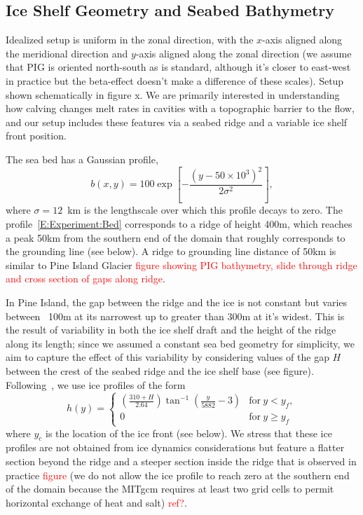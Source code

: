 \documentclass[draft]{agujournal2019}
\newcommand{\red}[1]{\textcolor{red}{#1}}
\begin{document}
\subsection{Ice Shelf Geometry and Seabed Bathymetry}\label{S:Experiment:Geometry}
Idealized setup is uniform in the zonal direction, with the $x$-axis aligned along the meridional direction and $y$-axis aligned along the zonal direction (we assume that PIG is oriented north-south as is standard, although it's closer to east-west in practice but the beta-effect doesn't make a difference of these scales). Setup shown schematically in figure x. We are primarily interested in understanding how calving changes melt rates in cavities with a topographic barrier to the flow, and our setup includes these features via a seabed ridge and a variable ice shelf front position. 

The sea bed has a Gaussian profile,
\begin{equation}\label{E:Experiment:Bed}
    b(x,y) = 100 \exp\left[-\frac{\left(y - 50\times 10^3\right)^2}{2\sigma^2}\right],
\end{equation}
where $\sigma = 12$~km is the lengthscale over which this profile decays to zero. The profile~\ref{E:Experiment:Bed} corresponds to a ridge of height 400m, which reaches a peak 50km from the southern end of the domain that roughly corresponds to the grounding line (see below). A ridge to grounding line distance of 50km is similar to Pine Island Glacier \red{figure showing PIG bathymetry, slide through ridge and cross section of gaps along ridge}.

In Pine Island, the gap between the ridge and the ice is not constant but varies between ~100m at its narrowest up to greater than 300m at it's widest. This is the result of variability in both the ice shelf draft and the height of the ridge along its length; since we assumed a constant sea bed geometry for simplicity, we aim to capture the effect of this variability by considering values of the gap $H$ between the crest of the seabed ridge and the ice shelf base (see figure). Following~, we use ice profiles of the form
\begin{equation}
    h(y) = \begin{cases}
    \left(\frac{310 + H}{2.64}\right)\tan^{-1}\left(\frac{y}{5882} -3\right) & \text{for}~y < y_f,\\
    0  & \text{for}~y \geq y_f
    \end{cases}
\end{equation}
where $y_c$ is the location of the ice front (see below). We stress that these ice profiles are not obtained from ice dynamics considerations but feature a flatter section beyond the ridge and a steeper section inside the ridge that is observed in practice \red{figure} (we do not allow the ice profile to reach zero at the southern end of the domain because the MITgcm requires at least two grid cells to permit horizontal exchange of heat and salt) \red{ref?}.
\end{document}
